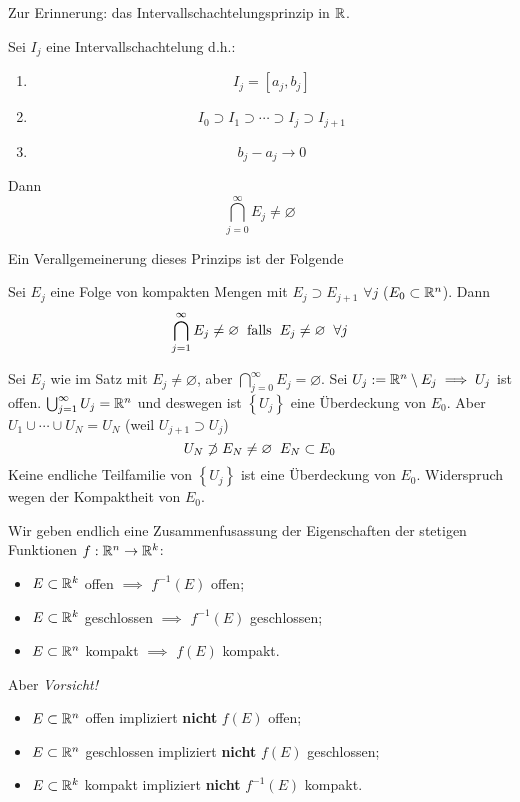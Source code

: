 Zur Erinnerung: das Intervallschachtelungsprinzip in $\mathbb{R}$. 

Sei $I_j$ eine Intervallschachtelung d.h.:
  \begin{enumerate}
    \item \[I_j=\left[ a_j,b_j \right]\]
    \item \[I_0\supset I_1\supset \cdots \supset I_j\supset I_{j+1}\]
    \item \[b_j-a_j\to 0\]
  \end{enumerate}
Dann
  \[\bigcap^\infty_{j=0}E_j\neq\varnothing\]

Ein Verallgemeinerung dieses Prinzips ist der Folgende

\begin{Sat}
  Sei $E_j$ eine Folge von kompakten Mengen mit $E_j\supset E_{j+1}$ $\forall j$ ($E_0\subset\mathbb{R}^n$).
Dann
  \[\bigcap_{j=1}^\infty E_j\neq\varnothing\hspace{2mm}\text{falls}\hspace{2mm} E_j\neq\varnothing \hspace{2mm}\forall j\]
\end{Sat}
\begin{Bew}
  Sei $E_j$ wie im Satz mit $E_j\neq\varnothing$, aber $\bigcap_{j=0}^\infty E_j=\varnothing$. Sei $U_j:=\mathbb{R}^n\setminus E_j\implies U_j$ ist offen. $\bigcup_{j=1}^\infty U_j=\mathbb{R}^n$ und deswegen
ist $\left\{ U_j \right\}$ eine Überdeckung von $E_0$. Aber $U_1\cup\cdots\cup U_N=U_N$ (weil $U_{j+1}\supset U_j$)
  \[U_N\not\supset E_N\neq \varnothing\hspace{2mm} E_N\subset E_0\]
  Keine endliche Teilfamilie von $\left\{ U_j \right\}$ ist eine Überdeckung von $E_0$. Widerspruch wegen der Kompaktheit von $E_0$.
\end{Bew}

Wir geben endlich eine Zusammenfusassung der Eigenschaften der stetigen Funktionen $f:\mathbb{R}^n\rightarrow 
\mathbb{R}^k$:
\begin{itemize}
\item $E\subset \mathbb{R}^k$ offen $\implies$ $f^{-1} (E)$ offen;
\item $E\subset \mathbb{R}^k$ geschlossen $\implies$ $f^{-1} (E)$ geschlossen;
\item $E\subset \mathbb{R}^n$ kompakt $\implies$ $f(E)$ kompakt.
\end{itemize}
Aber {\em Vorsicht!}
\begin{itemize}
\item $E\subset \mathbb{R}^n$ offen impliziert {\bf nicht} $f(E)$ offen;
\item $E\subset \mathbb{R}^n$ geschlossen impliziert {\bf nicht} $f(E)$ geschlossen;
\item $E\subset \mathbb{R}^k$ kompakt impliziert {\bf nicht} $f^{-1} (E)$ kompakt.
\end{itemize}
